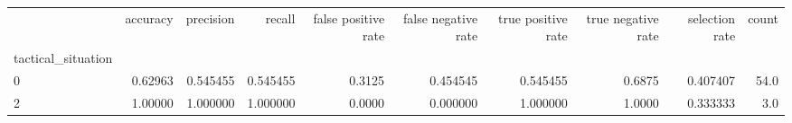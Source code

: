 \begin{tabular}{lrrrrrrrrr}
\toprule
{} &  accuracy &  precision &    recall &  false positive rate &  false negative rate &  true positive rate &  true negative rate &  selection rate &  count \\
tactical\_situation &           &            &           &                      &                      &                     &                     &                 &        \\
\midrule
0                  &   0.62963 &   0.545455 &  0.545455 &               0.3125 &             0.454545 &            0.545455 &              0.6875 &        0.407407 &   54.0 \\
2                  &   1.00000 &   1.000000 &  1.000000 &               0.0000 &             0.000000 &            1.000000 &              1.0000 &        0.333333 &    3.0 \\
\bottomrule
\end{tabular}
